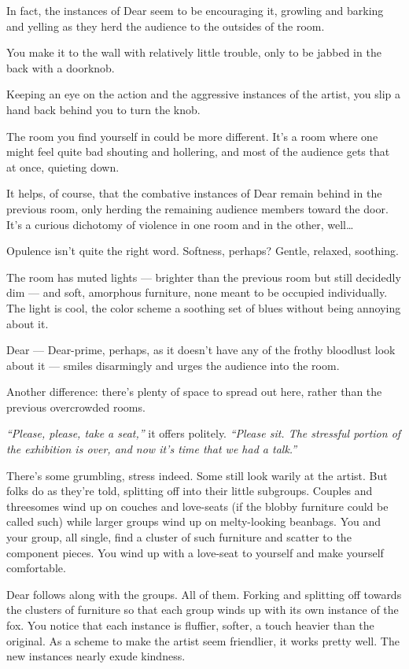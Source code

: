 In fact, the instances of Dear seem to be encouraging it, growling and barking and yelling as they herd the audience to the outsides of the room.

You make it to the wall with relatively little trouble, only to be jabbed in the back with a doorknob.

Keeping an eye on the action and the aggressive instances of the artist, you slip a hand back behind you to turn the knob.

\newpage

The room you find yourself in could be more different. It's a room where one might feel quite bad shouting and hollering, and most of the audience gets that at once, quieting down.

It helps, of course, that the combative instances of Dear remain behind in the previous room, only herding the remaining audience members toward the door. It's a curious dichotomy of violence in one room and in the other, well\ldots{}

Opulence isn't quite the right word. Softness, perhaps? Gentle, relaxed, soothing.

The room has muted lights --- brighter than the previous room but still decidedly dim --- and soft, amorphous furniture, none meant to be occupied individually. The light is cool, the color scheme a soothing set of blues without being annoying about it.

Dear --- Dear-prime, perhaps, as it doesn't have any of the frothy bloodlust look about it --- smiles disarmingly and urges the audience into the room.

Another difference: there's plenty of space to spread out here, rather than the previous overcrowded rooms.

\emph{``Please, please, take a seat,''} it offers politely. \emph{``Please sit. The stressful portion of the exhibition is over, and now it's time that we had a talk.''}

There's some grumbling, stress indeed. Some still look warily at the artist. But folks do as they're told, splitting off into their little subgroups. Couples and threesomes wind up on couches and love-seats (if the blobby furniture could be called such) while larger groups wind up on melty-looking beanbags. You and your group, all single, find a cluster of such furniture and scatter to the component pieces. You wind up with a love-seat to yourself and make yourself comfortable.

Dear follows along with the groups. All of them. Forking and splitting off towards the clusters of furniture so that each group winds up with its own instance of the fox. You notice that each instance is fluffier, softer, a touch heavier than the original. As a scheme to make the artist seem friendlier, it works pretty well. The new instances nearly exude kindness.

